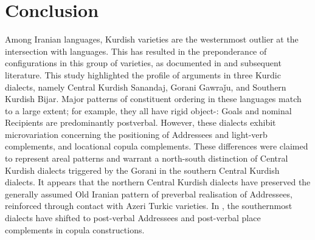 \documentclass[output=paper,colorlinks,citecolor=brown]{langscibook}
\begin{document}
\begin{sloppypar}
\section{Conclusion} \label{MFKC: sec.conc}
Among Iranian languages, Kurdish varieties are the westernmost outlier at the intersection with  languages. This has resulted in the preponderance of   configurations in this group of varieties, as documented in \citet{haig_verb-goal_2015} and subsequent literature. This study highlighted the  profile of  arguments in three Kurdic dialects, namely Central Kurdish Sanandaj, Gorani Gawraǰu, and Southern Kurdish Bijar. Major patterns of constituent ordering in these languages match to a large extent; for example, they all have rigid object-: Goals and nominal Recipients are predominantly postverbal. However, these dialects exhibit microvariation concerning the positioning of Addressees and light-verb complements, and locational copula complements. These differences were claimed to represent areal patterns and warrant a north-south distinction of Central Kurdish dialects triggered by the Gorani  in the southern Central Kurdish dialects. It appears that the northern Central Kurdish dialects have preserved the generally assumed Old Iranian pattern of preverbal realisation of Addressees, reinforced through contact with Azeri Turkic varieties. In , the southernmost dialects have shifted to post-verbal Addressees and post-verbal place complements in copula constructions. 


\end{sloppypar}
\end{document}
